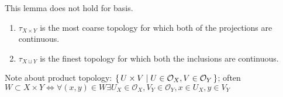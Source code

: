 \begin{remark}
    This lemma does not hold for basis.
\end{remark}


\begin{remark}
    \begin{enumerate}
        \item \(\tau_{X \times Y}\) is the most coarse topology for which both of the projections are continuous.
        \item \(\tau_{X \sqcup Y}\) is the finest topology for which both the inclusions are continuous.
    \end{enumerate}
\end{remark}

    Note about product topology: \(\left\{\, U \times V \mid U \in \mathcal{O}_X, V \in \mathcal{O}_Y \,\right\}\); often \(W \subset X \times Y \iff \forall (x, y) \in W \exists U_X \in \mathcal{O}_X, V_Y \in \mathcal{O}_Y, x \in U_X, y \in V_Y\)